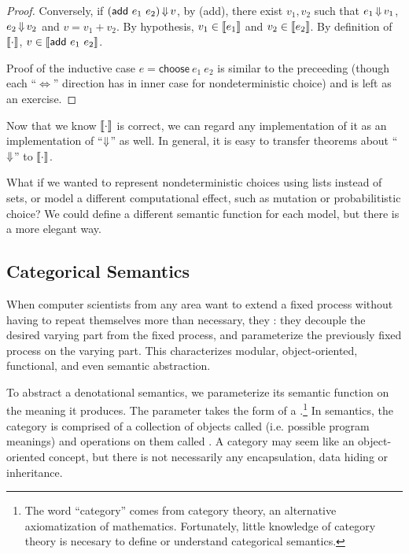 {\begin{proof}
Conversely, if $(\mathsf{add}~e_1~e_2) \operatorname{\Downarrow} v$,
by (add), there exist $v_1,v_2$ such that $e_1 \operatorname{\Downarrow} v_1$, $e_2 \operatorname{\Downarrow} v_2$ and $v = v_1 + v_2$.
By hypothesis, $v_1 \in \left\llbracket{e_1}\right\rrbracket$ and $v_2 \in \left\llbracket{e_2}\right\rrbracket$.
By definition of $\left\llbracket{\cdot}\right\rrbracket$, $v \in \left\llbracket{\mathsf{add}~e_1~e_2}\right\rrbracket$.

Proof of the inductive case $e = \mathsf{choose}~e_1~e_2$ is similar to the preceeding (though each ``${\Longleftrightarrow}$'' direction has in inner case for nondeterministic choice) and is left as an exercise.
\end{proof}

Now that we know $\left\llbracket{\cdot}\right\rrbracket$ is correct, we can regard any implementation of it as an implementation of ``$\operatorname{\Downarrow}$''  as well.
In general, it is easy to transfer theorems about ``$\operatorname{\Downarrow}$'' to $\left\llbracket{\cdot}\right\rrbracket$.

What if we wanted to represent nondeterministic choices using lists instead of sets, or model a different computational effect, such as mutation or probabilitistic choice?
We could define a different semantic function for each model, but there is a more elegant way.


\subsection{Categorical Semantics}

When computer scientists from any area want to extend a fixed process without having to repeat themselves more than necessary, they : they decouple the desired varying part from the fixed process, and parameterize the previously fixed process on the varying part.
This characterizes modular, object-oriented, functional, and even semantic abstraction.

To abstract a denotational semantics, we parameterize its semantic function on the meaning it produces.
The parameter takes the form of a .\footnote{The word ``category'' comes from category theory, an alternative axiomatization of mathematics. Fortunately, little knowledge of category theory is necesary to define or understand categorical semantics.}
In semantics, the category is comprised of a collection of objects called  (i.e. possible program meanings) and operations on them called .
A category may seem like an object-oriented concept, but there is not necessarily any encapsulation, data hiding or inheritance.

}
